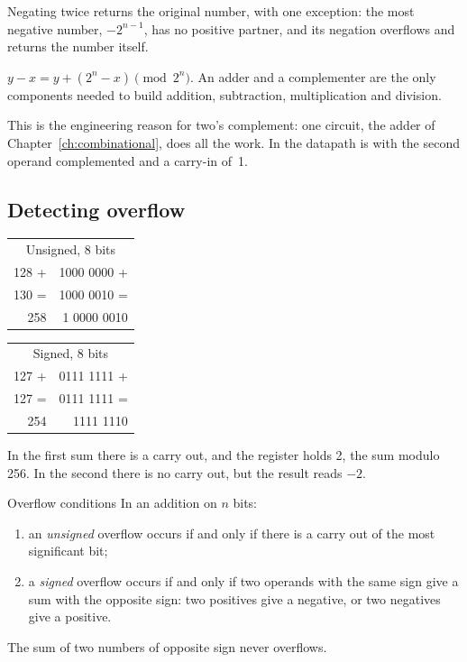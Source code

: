 Negating twice returns the original number, with one exception: the most
negative number, $-2^{n-1}$, has no positive partner, and its negation
overflows and returns the number itself.


\begin{prgconcept}
$y - x = y + (2^{n}-x) \pmod{2^{n}}$. An adder and a complementer are the
only components needed to build addition, subtraction, multiplication and
division.
\end{prgconcept}

This is the engineering reason for two's complement: one circuit, the adder of
Chapter~\ref{ch:combinational}, does all the work. In the \riscv datapath
 is  with the second operand complemented and a carry-in
of~1.

\subsection{Detecting overflow}

\begin{center}\ttfamily
\begin{tabular}{@{}r@{\quad}r@{}}
\multicolumn{2}{c}{\textsf{\small Unsigned, 8 bits}}\\
128 + & 1000 0000 +\\ 130 = & 1000 0010 =\\\hline 258 & \textcolor{prgred}{1} 0000 0010
\end{tabular}\qquad\qquad\qquad
\begin{tabular}{@{}r@{\quad}r@{}}
\multicolumn{2}{c}{\textsf{\small Signed, 8 bits}}\\
127 + & 0111 1111 +\\ 127 = & 0111 1111 =\\\hline 254 & \textcolor{prgred}{1}111 1110
\end{tabular}
\end{center}

In the first sum there is a carry out, and the register holds 2, the sum
modulo 256. In the second there is no carry out, but the result reads $-2$.

\begin{theorem}{Overflow conditions}
In an addition on $n$ bits:
\begin{enumerate}[nosep]
\item an \emph{unsigned} overflow occurs if and only if there is a carry out of
  the most significant bit;
\item a \emph{signed} overflow occurs if and only if two operands with the same
  sign give a sum with the opposite sign: two positives give a negative, or
  two negatives give a positive.
\end{enumerate}
The sum of two numbers of opposite sign never overflows.
\end{theorem}

